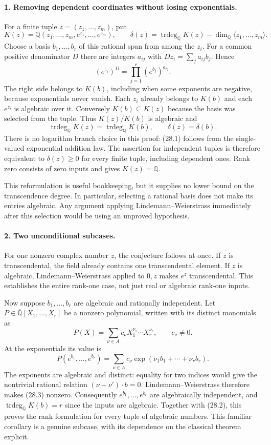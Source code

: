 \documentclass[11pt]{article}
\begin{document}
\paragraph{1. Removing dependent coordinates without losing exponentials.}
For a finite tuple $z=(z_1,\ldots,z_m)$, put
\[
 K(z)=\mathbb Q(z_1,\ldots,z_m,e^{z_1},\ldots,e^{z_m}),\qquad
 \delta(z)=\operatorname{trdeg}_{\mathbb Q}K(z)
       -\dim_{\mathbb Q}\langle z_1,\ldots,z_m\rangle.
\]
Choose a basis $b_1,\ldots,b_r$ of this rational span from among the $z_i$.
For a common positive denominator $D$ there are integers $a_{ij}$ with
$Dz_i=\sum_j a_{ij}b_j$. Hence
\[
 (e^{z_i})^D=\prod_{j=1}^r(e^{b_j})^{a_{ij}}.
 \tag{28.1}
\]
The right side belongs to $K(b)$, including when some exponents are negative,
because exponentials never vanish. Each $z_i$ already belongs to $K(b)$ and
each $e^{z_i}$ is algebraic over it. Conversely $K(b)\subseteq K(z)$ because
the basis was selected from the tuple. Thus $K(z)/K(b)$ is algebraic and
\[
 \operatorname{trdeg}_{\mathbb Q}K(z)
 =\operatorname{trdeg}_{\mathbb Q}K(b),\qquad \delta(z)=\delta(b).
 \tag{28.2}
\]
There is no logarithm branch choice in this proof: (28.1) follows from the
single-valued exponential addition law. The assertion for independent tuples
is therefore equivalent to $\delta(z)\geq0$ for every finite tuple, including
dependent ones. Rank zero consists of zero inputs and gives $K(z)=\mathbb Q$.

This reformulation is useful bookkeeping, but it supplies no lower bound on
the transcendence degree. In particular, selecting a rational basis does not
make its entries algebraic. Any argument applying Lindemann--Weierstrass
immediately after this selection would be using an unproved hypothesis.

\paragraph{2. Two unconditional subcases.}
For one nonzero complex number $z$, the conjecture follows at once. If $z$
is transcendental, the field already contains one transcendental element.
If $z$ is algebraic, Lindemann--Weierstrass applied to $0,z$ makes $e^z$
transcendental. This establishes the entire rank-one case, not just real or
algebraic rank-one inputs.

Now suppose $b_1,\ldots,b_r$ are algebraic and rationally independent. Let
$P\in\overline{\mathbb Q}[X_1,\ldots,X_r]$ be a nonzero polynomial, written
with its distinct monomials as
\[
 P(X)=\sum_{\nu\in A}c_\nu X_1^{\nu_1}\cdots X_r^{\nu_r},
 \qquad c_\nu\ne0.
\]
At the exponentials its value is
\[
 P(e^{b_1},\ldots,e^{b_r})
 =\sum_{\nu\in A}c_\nu\exp(\nu_1b_1+\cdots+\nu_rb_r).
 \tag{28.3}
\]
The exponents are algebraic and distinct: equality for two indices would give
the nontrivial rational relation $(\nu-\nu')\cdot b=0$.
Lindemann--Weierstrass therefore makes (28.3) nonzero. Consequently
$e^{b_1},\ldots,e^{b_r}$ are algebraically independent, and
$\operatorname{trdeg}_{\mathbb Q}K(b)=r$ since the inputs are algebraic.
Together with (28.2), this proves the rank formulation for every tuple of
algebraic numbers. This familiar corollary is a genuine subcase, with its
dependence on the classical theorem explicit.
\end{document}
